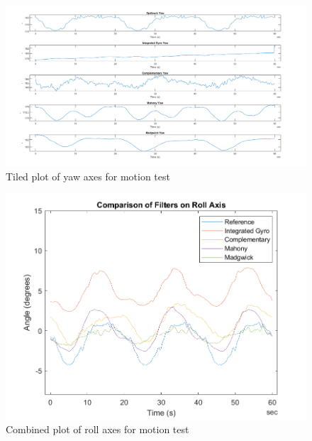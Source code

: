 \begin{figure}[H]
    \centering
    \includegraphics[scale=0.5]{graphics/Navigation/TiledMotionYaw.png}
    \caption{Tiled plot of yaw axes for motion test}
     \label{fig:Tiled plot of filters yaw axes for motion test}
\end{figure}


\begin{figure}[H]
    \centering
    \includegraphics[scale=1]{graphics/Navigation/CombinedMotionRoll.png}
    \caption{Combined plot of roll axes for motion test}
     \label{fig:Combined plot of roll axes for motion test}
\end{figure}


